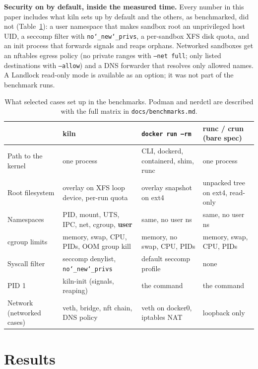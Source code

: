 \documentclass[10pt,letterpaper]{article}
\newcommand{\code}[1]{\texttt{#1}}
\newcommand{\us}{\char`\_}
\begin{document}
\textbf{Security on by default, inside the measured time.} Every number in this
paper includes what kiln sets up by default and the others, as benchmarked, did
not (Table~\ref{tab:setup}): a user namespace that makes sandbox root an
unprivileged host UID, a seccomp filter with \code{no\us{}new\us{}privs}, a
per-sandbox XFS disk quota, and an init process that forwards signals and reaps
orphans. Networked sandboxes get an nftables egress policy (no private ranges
with \code{--net full}; only listed destinations with \code{--allow}) and a DNS
forwarder that resolves only allowed names. A Landlock read-only mode is
available as an option; it was not part of the benchmark runs.

\begin{table}[t]
\centering\small
\caption{What selected cases set up in the benchmarks. Podman and nerdctl are
described with the full matrix in \code{docs/benchmarks.md}.}
\label{tab:setup}
\begin{tabularx}{\linewidth}{@{}l>{\raggedright\arraybackslash}X>{\raggedright\arraybackslash}X>{\raggedright\arraybackslash}X@{}}
\toprule
 & kiln & \code{docker run --rm} & runc / crun (bare spec) \\
\midrule
Path to the kernel & one process & CLI, dockerd, containerd, shim, runc & one process \\
Root filesystem & overlay on XFS loop device, per-run quota & overlay snapshot on ext4 & unpacked tree on ext4, read-only \\
Namespaces & PID, mount, UTS, IPC, net, cgroup, \textbf{user} & same, no user ns & same, no user ns \\
cgroup limits & memory, swap, CPU, PIDs, OOM group kill & memory, no swap, CPU, PIDs & memory, swap, CPU, PIDs \\
Syscall filter & seccomp denylist, \code{no\us{}new\us{}privs} & default seccomp profile & none \\
PID 1 & kiln-init (signals, reaping) & the command & the command \\
Network (networked cases) & veth, bridge, nft chain, DNS policy & veth on docker0, iptables NAT & loopback only \\
\bottomrule
\end{tabularx}
\end{table}

\section{Results}
\label{sec:results}
\end{document}
